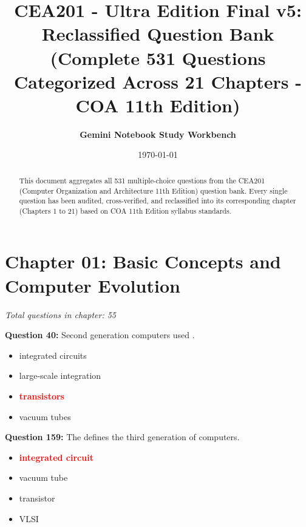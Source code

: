 \documentclass[12pt,a4paper]{article}
\begin{document}
\title{\textbf{CEA201 - Ultra Edition Final v5: Reclassified Question Bank}\\\large (Complete 531 Questions Categorized Across 21 Chapters - COA 11th Edition)}
\author{\textbf{Gemini Notebook Study Workbench}}
\date{\today}
\maketitle

\begin{abstract}
\noindent This document aggregates all 531 multiple-choice questions from the CEA201 (Computer Organization and Architecture 11th Edition) question bank. Every single question has been audited, cross-verified, and reclassified into its corresponding chapter (Chapters 1 to 21) based on COA 11th Edition syllabus standards.
\end{abstract}

\tableofcontents
\newpage

\section{Chapter 01: Basic Concepts and Computer Evolution}
\textit{Total questions in chapter: 55}

\textbf{Question 40:} Second generation computers used \underline{\hspace{1.5cm}}.

\begin{itemize}
    \item[\textbf{A.}] integrated circuits
    \item[\textbf{B.}] large-scale integration
    \item[\textbf{C.}] \textcolor{red}{\textbf{transistors}}
    \item[\textbf{D.}] vacuum tubes
\end{itemize}

\vspace{0.5cm}

\vspace{0.5cm}

\textbf{Question 159:} The \underline{\hspace{1.5cm}} defines the third generation of computers.

\begin{itemize}
    \item[\textbf{A.}] \textcolor{red}{\textbf{integrated circuit}}
    \item[\textbf{B.}] vacuum tube
    \item[\textbf{C.}] transistor
    \item[\textbf{D.}] VLSI
\end{itemize}
\end{document}
